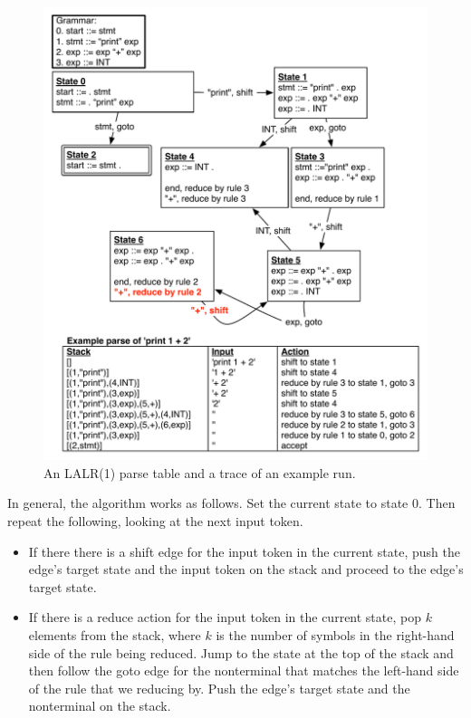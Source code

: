 \documentclass[7x10]{TimesAPriori_MIT}%
\numberwithin{theorem}{chapter}
\numberwithin{definition}{chapter}
\numberwithin{equation}{chapter}
\begin{document}
{\begin{figure}[htbp]
  \centering
\includegraphics[width=5.0in]{figs/shift-reduce-conflict}  
  \caption{An LALR(1) parse table and a trace of an example run.}
  \label{fig:shift-reduce}
\end{figure}

In general, the algorithm works as follows. Set the current state to
state $0$. Then repeat the following, looking at the next input token.
\begin{itemize}
\item If there there is a shift edge for the input token in the
  current state, push the edge's target state and the input token on
  the stack and proceed to the edge's target state.
\item If there is a reduce action for the input token in the current
  state, pop $k$ elements from the stack, where $k$ is the number of
  symbols in the right-hand side of the rule being reduced. Jump to
  the state at the top of the stack and then follow the goto edge for
  the nonterminal that matches the left-hand side of the rule that we
  reducing by. Push the edge's target state and the nonterminal on the
  stack.
\end{itemize}

}
\end{document}
